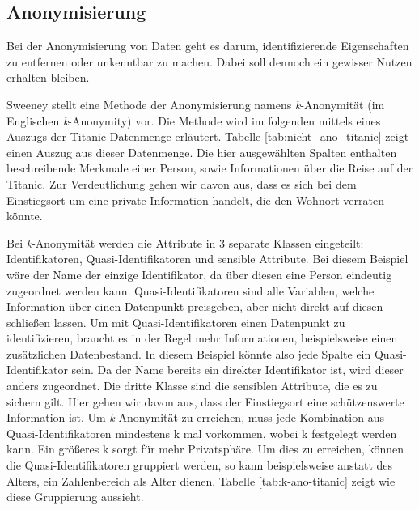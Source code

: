 \subsection{Anonymisierung}\label{sec:anonymisierung}

Bei der Anonymisierung von Daten geht es darum, identifizierende Eigenschaften zu entfernen oder unkenntbar zu machen.
Dabei soll dennoch ein gewisser Nutzen erhalten bleiben. 

Sweeney \cite{P-23} stellt eine Methode der Anonymisierung namens \textit{k}-Anonymität (im Englischen \textit{k}-Anonymity) vor.
Die Methode wird im folgenden mittels eines Auszugs der Titanic Datenmenge \cite{D-titanic} erläutert.
Tabelle \ref{tab:nicht_ano_titanic} zeigt einen Auszug aus dieser Datenmenge.
Die hier ausgewählten Spalten enthalten beschreibende Merkmale einer Person, sowie Informationen über die Reise auf der Titanic. 
Zur Verdeutlichung gehen wir davon aus, dass es sich bei dem Einstiegsort um eine private Information handelt, die den Wohnort verraten könnte.



Bei \textit{k}-Anonymität werden die Attribute in 3 separate Klassen eingeteilt: Identifikatoren, Quasi-Identifikatoren und sensible Attribute.
Bei diesem Beispiel wäre der Name der einzige Identifikator, da über diesen eine Person eindeutig zugeordnet werden kann. 
Quasi-Identifikatoren sind alle Variablen, welche Information über einen Datenpunkt preisgeben, aber nicht direkt auf diesen schließen lassen. 
Um mit Quasi-Identifikatoren einen Datenpunkt zu identifizieren, braucht es in der Regel mehr Informationen, beispielsweise einen zusätzlichen Datenbestand.
In diesem Beispiel könnte also jede Spalte ein Quasi-Identifikator sein.
Da der Name bereits ein direkter Identifikator ist, wird dieser anders zugeordnet.
Die dritte Klasse sind die sensiblen Attribute, die es zu sichern gilt. 
Hier gehen wir davon aus, dass der Einstiegsort eine schützenswerte Information ist.
Um \textit{k}-Anonymität zu erreichen, muss jede Kombination aus Quasi-Identifikatoren mindestens k mal vorkommen, wobei k festgelegt werden kann. 
Ein größeres k sorgt für mehr Privatsphäre.
Um dies zu erreichen, können die Quasi-Identifikatoren gruppiert werden, so kann beispielsweise anstatt des Alters, ein Zahlenbereich als Alter dienen.
Tabelle \ref{tab:k-ano-titanic} zeigt wie diese Gruppierung aussieht.

